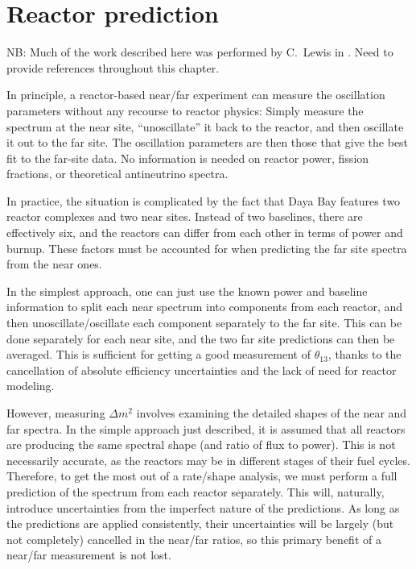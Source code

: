 \documentclass[../thesis.tex]{subfiles}
\begin{document}
\chapter{Reactor prediction}
\label{chap:reactor}

NB: Much of the work described here was performed by C.~Lewis in \cite{Lewis}. Need to provide references throughout this chapter.

In principle, a reactor-based near/far experiment can measure the oscillation parameters without any recourse to reactor physics: Simply measure the spectrum at the near site, ``unoscillate'' it back to the reactor, and then oscillate it out to the far site. The oscillation parameters are then those that give the best fit to the far-site data. No information is needed on reactor power, fission fractions, or theoretical antineutrino spectra.

In practice, the situation is complicated by the fact that Daya Bay features two reactor complexes and two near sites. Instead of two baselines, there are effectively six, and the reactors can differ from each other in terms of power and burnup. These factors must be accounted for when predicting the far site spectra from the near ones.

In the simplest approach, one can just use the known power and baseline information to split each near spectrum into components from each reactor, and then unoscillate/oscillate each component separately to the far site. This can be done separately for each near site, and the two far site predictions can then be averaged. This is sufficient for getting a good measurement of $\theta_{13}$, thanks to the cancellation of absolute efficiency uncertainties and the lack of need for reactor modeling.

However, measuring $\Delta m^2$ involves examining the detailed shapes of the near and far spectra. In the simple approach just described, it is assumed that all reactors are producing the same spectral shape (and ratio of flux to power). This is not necessarily accurate, as the reactors may be in different stages of their fuel cycles. Therefore, to get the most out of a rate/shape analysis, we must perform a full prediction of the spectrum from each reactor separately. This will, naturally, introduce uncertainties from the imperfect nature of the predictions. As long as the predictions are applied consistently, their uncertainties will be largely (but not completely) cancelled in the near/far ratios, so this primary benefit of a near/far measurement is not lost.
\end{document}

